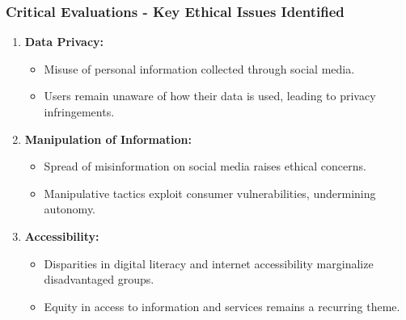 \documentclass{beamer}
\begin{document}
\begin{frame}[fragile]
    \frametitle{Critical Evaluations - Key Ethical Issues Identified}
    \begin{enumerate}
        \item \textbf{Data Privacy:} 
        \begin{itemize}
            \item Misuse of personal information collected through social media.
            \item Users remain unaware of how their data is used, leading to privacy infringements.
        \end{itemize}
        
        \item \textbf{Manipulation of Information:}
        \begin{itemize}
            \item Spread of misinformation on social media raises ethical concerns.
            \item Manipulative tactics exploit consumer vulnerabilities, undermining autonomy.
        \end{itemize}
        
        \item \textbf{Accessibility:}
        \begin{itemize}
            \item Disparities in digital literacy and internet accessibility marginalize disadvantaged groups.
            \item Equity in access to information and services remains a recurring theme.
        \end{itemize}
    \end{enumerate}
\end{frame}
\end{document}
